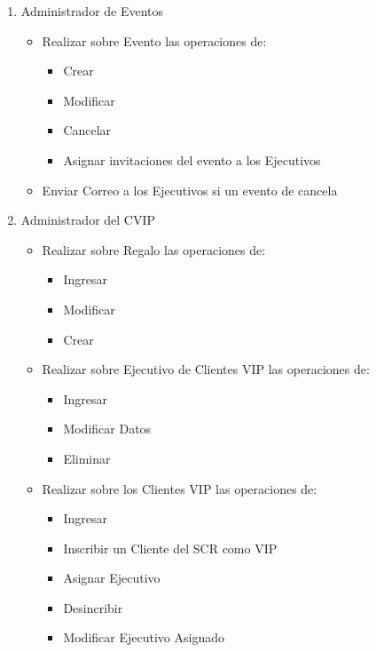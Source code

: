 \begin{enumerate}
\begin{itemize}
	\end{itemize}
	\item Administrador de Eventos
	\begin{itemize}
		\item Realizar sobre Evento las operaciones de:
		\begin{itemize}
			\item Crear 
			\item Modificar
			\item Cancelar
			\item Asignar invitaciones del evento a los Ejecutivos
		\end{itemize}
		\item Enviar Correo a los Ejecutivos si un evento de cancela 
	\end{itemize}
	\item Administrador del CVIP
	\begin{itemize}
		\item Realizar sobre Regalo las operaciones de:
		\begin{itemize}
			\item Ingresar
			\item Modificar
			\item Crear
		\end{itemize}
		\item Realizar sobre Ejecutivo de Clientes VIP las operaciones de:
		\begin{itemize}
			\item Ingresar
			\item Modificar Datos
			\item Eliminar
		\end{itemize}
		\item Realizar sobre los Clientes VIP las operaciones de:
		\begin{itemize}
			\item Ingresar
			\item Inscribir un Cliente del SCR como VIP
			\item Asignar Ejecutivo
			\item Desincribir
			\item Modificar Ejecutivo Asignado
		\end{itemize}
	\end{itemize}
\end{enumerate}
